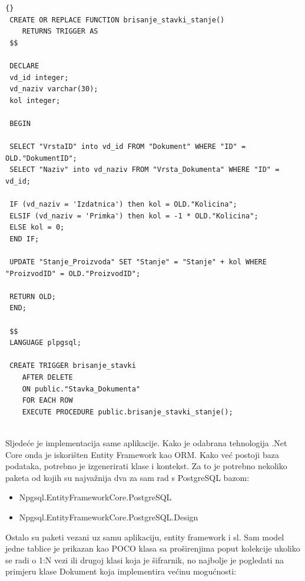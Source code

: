 \documentclass[a4paper,12pt]{foi}
\begin{document}
\lstset{commentstyle=\textit,language=SQL}
\begin{lstlisting}[frame=tb]{}
 CREATE OR REPLACE FUNCTION brisanje_stavki_stanje()
	RETURNS TRIGGER AS
 $$
 
 DECLARE
 vd_id integer;
 vd_naziv varchar(30);
 kol integer;

 BEGIN

 SELECT "VrstaID" into vd_id FROM "Dokument" WHERE "ID" = OLD."DokumentID";
 SELECT "Naziv" into vd_naziv FROM "Vrsta_Dokumenta" WHERE "ID" = vd_id;

 IF (vd_naziv = 'Izdatnica') then kol = OLD."Kolicina";
 ELSIF (vd_naziv = 'Primka') then kol = -1 * OLD."Kolicina";
 ELSE kol = 0;
 END IF;

 UPDATE "Stanje_Proizvoda" SET "Stanje" = "Stanje" + kol WHERE "ProizvodID" = OLD."ProizvodID";

 RETURN OLD;
 END;

 $$
 LANGUAGE plpgsql;

 CREATE TRIGGER brisanje_stavki
    AFTER DELETE
    ON public."Stavka_Dokumenta"
    FOR EACH ROW
    EXECUTE PROCEDURE public.brisanje_stavki_stanje();
    
\end{lstlisting}

Sljedeće je implementacija same aplikacije. Kako je odabrana tehnologija .Net Core onda je iskorišten Entity Framework kao ORM. Kako već postoji baza podataka, potrebno je izgenerirati klase i kontekst. Za to je potrebno nekoliko paketa od kojih su najvažnija dva za sam rad s PostgreSQL bazom:

\begin{itemize}
	\item Npgsql.EntityFrameworkCore.PostgreSQL
	\item Npgsql.EntityFrameworkCore.PostgreSQL.Design
\end{itemize}

Ostalo su paketi vezani uz samu aplikaciju, entity framework i sl. Sam model jedne tablice je prikazan kao POCO klasa sa proširenjima poput kolekcije ukoliko se radi o 1:N vezi ili drugoj klasi koja je šifrarnik, no najbolje je pogledati na primjeru klase Dokument koja implementira većinu mogućnosti:
\end{document}
